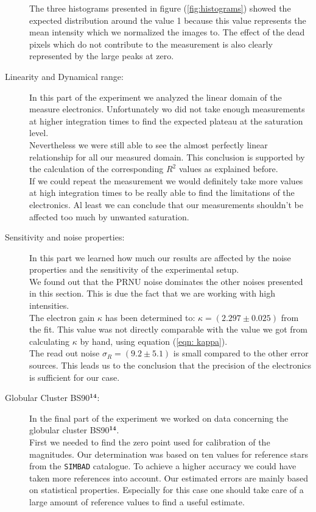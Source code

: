 \begin{description}
	The three histograms presented in figure (\ref{fig:histograms}) showed the expected distribution around the value 1 because this value represents the mean intensity which we normalized the images to. The effect of the dead pixels which do not contribute to the measurement is also clearly represented by the large peaks at zero. 
	\item[Linearity and Dynamical range:] In this part of the experiment we analyzed the linear domain of the measure electronics. Unfortunately wo did not take enough measurements at higher integration times to find the expected plateau at the saturation level. \\
	Nevertheless we were still able to see the almost perfectly linear relationship for all our measured domain. This conclusion is supported by the calculation of the corresponding $R^2$ values as explained before. \\
	If we could repeat the measurement we would definitely take more values at high integration times to be really able to find the limitations of the electronics. Al least we can conclude that our measurements shouldn't be affected too much by unwanted saturation. 
	\item[Sensitivity and noise properties:] In this part we learned how much our results are affected by the noise properties and the sensitivity of the experimental setup. \\
	We found out that the PRNU noise dominates the other noises presented in this section. This is due the fact that we are working with high intensities.\\
	The electron gain $\kappa$ has been determined to: $\kappa = (2.297 \pm 0.025)$ from the fit. This value was not directly comparable with the value we got from calculating $\kappa$ by hand, using equation (\ref{eqn: kappa}). \\
	The read out noise $\sigma_R = (9.2 \pm 5.1)$ is small compared to the other error sources. This leads us to the conclusion that the precision of the electronics is sufficient for our case.
	\item[Globular Cluster BS90$^{\mathbf{14}}$:] In the final part of the experiment we worked on data concerning the globular cluster BS90$^{\mathbf{14}}$. \\
	First we needed to find the zero point used for calibration of the magnitudes. Our determination was based on ten values for reference stars from the \texttt{SIMBAD} catalogue. To achieve a higher accuracy we could have taken more references into account. Our estimated errors are mainly based on statistical properties. Especially for this case one should take care of a large amount of reference values to find a useful estimate. \\

\end{description}

